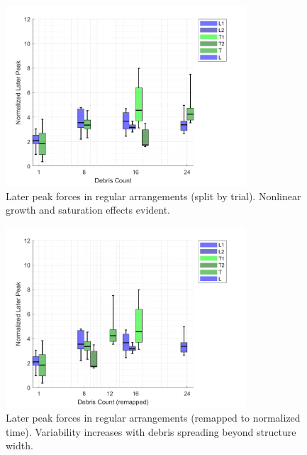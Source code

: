 \documentclass{article}
\begin{document}
\begin{figure}[htbp]
    \centering
    \includegraphics[width=0.8\textwidth]{LaterPeak_Regular_SplitByTrial.png}
    \caption{Later peak forces in regular arrangements (split by trial). Nonlinear growth and saturation effects evident.}
    \label{fig:laterpeak_regular_split}
\end{figure}

\begin{figure}[htbp]
    \centering
    \includegraphics[width=0.8\textwidth]{LaterPeak_Regular_RemappedT.png}
    \caption{Later peak forces in regular arrangements (remapped to normalized time). Variability increases with debris spreading beyond structure width.}
    \label{fig:laterpeak_regular_remap}
\end{figure}
\end{document}
